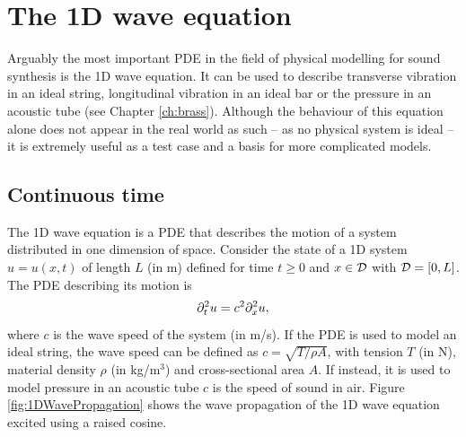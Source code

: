 
    
    
    

\section{%
The 1D wave equation}\label{sec:1DWave}
Arguably the most important PDE in the field of physical modelling for sound synthesis is the 1D wave equation. It can be used to describe transverse vibration in an ideal string, longitudinal vibration in an ideal bar or the pressure in an acoustic tube (see Chapter \ref{ch:brass}). Although the behaviour of this equation alone does not appear in the real world as such -- as no physical system is ideal -- it is extremely useful as a test case and a basis for more complicated models. %

\subsection{Continuous time}\label{sec:1DwaveContTime}
The 1D wave equation is a PDE that describes the motion of a system distributed in one dimension of space. Consider the state of a 1D system $u=u(x,t)$ of length $L$ (in m) defined for time $t\geq 0$ and $x\in \mathcal{D}$ with $\mathcal{D} = [0, L]$. The PDE describing its motion is
\begin{equation}\label{eq:1DwavePDE}
    \partial_t^2 u = c^2 \partial_x^2 u,
\end{equation}
where $c$ is the wave speed of the system (in m/s). If the PDE is used to model an ideal string, the wave speed can be defined as $c = \sqrt{T / \rho A}$, with tension $T$ (in N), material density $\rho$ (in kg/m$^3$) and cross-sectional area $A$. If instead, it is used to model pressure in an acoustic tube $c$ is the speed of sound in air. Figure \ref{fig:1DWavePropagation} shows the wave propagation of the 1D wave equation excited using a raised cosine. 

